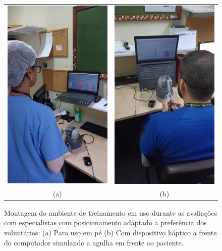 \begin{figure}[ht!]
    \centering
        \begin{tabular}{cc}
        \includegraphics[angle=270,width=0.4\linewidth]{capitulos/figuras/montagem-teste-especialistas-2.jpg} & 
        \includegraphics[angle=270,width=0.4\linewidth]{capitulos/figuras/montagem-teste-especialistas-3.jpg} 
        \\
        (a) & (b)
        \end{tabular}
    \caption{Montagem do ambiente de treinamento em uso durante as avaliações com especialistas com posicionamento adaptado a preferência dos voluntários: (a) Para uso em pé (b) Com dispositivo háptico a frente do computador simulando a agulha em frente ao paciente.}
    \label{fig:montagemTesteEspecialistas2e3}
\end{figure}

